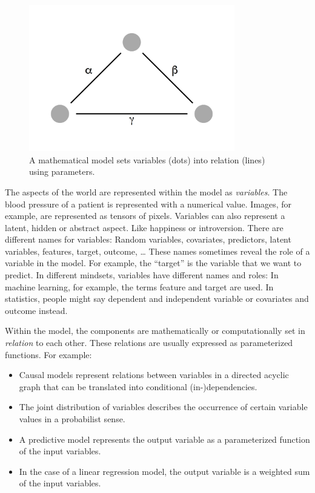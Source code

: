 \documentclass[
  10pt,
]{scrbook}
\providecommand{\tightlist}{%
  \setlength{\itemsep}{0pt}\setlength{\parskip}{0pt}}
\begin{document}
\begin{figure}

{\centering \includegraphics[width=0.8\textwidth]{figures/model-1} 

}

\caption{A mathematical model sets variables (dots) into relation (lines) using parameters.}\label{fig:model}
\end{figure}

The aspects of the world are represented within the model as \emph{variables}.
The blood pressure of a patient is represented with a numerical value.
Images, for example, are represented as tensors of pixels.
Variables can also represent a latent, hidden or abstract aspect.
Like happiness or introversion.
There are different names for variables:
Random variables, covariates, predictors, latent variables, features, target, outcome, \ldots{}
These names sometimes reveal the role of a variable in the model.
For example, the ``target'' is the variable that we want to predict.
In different mindsets, variables have different names and roles:
In machine learning, for example, the terms feature and target are used.
In statistics, people might say dependent and independent variable or covariates and outcome instead.

Within the model, the components are mathematically or computationally set in \emph{relation} to each other.
These relations are usually expressed as parameterized functions.
For example:

\begin{itemize}
\tightlist
\item
  Causal models represent relations between variables in a directed acyclic graph that can be translated into conditional (in-)dependencies.
\item
  The joint distribution of variables describes the occurrence of certain variable values in a probabilist sense.
\item
  A predictive model represents the output variable as a parameterized function of the input variables.
\item
  In the case of a linear regression model, the output variable is a weighted sum of the input variables.
\end{itemize}
\end{document}
